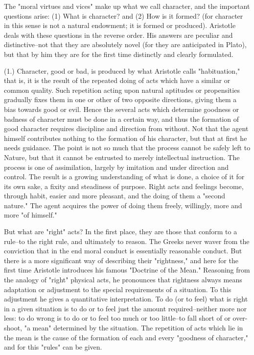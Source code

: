 The "moral virtues and vices" make up what we call character, and the
important questions arise: (1) What is character? and (2) How is it
formed? (for character in this sense is not a natural endowment; it is
formed or produced). Aristotle deals with these questions in the reverse
order. His answers are peculiar and distinctive--not that they are
absolutely novel (for they are anticipated in Plato), but that by him
they are for the first time distinctly and clearly formulated.

(1.) Character, good or bad, is produced by what Aristotle calls
"habituation," that is, it is the result of the repeated doing of acts
which have a similar or common quality. Such repetition acting upon
natural aptitudes or propensities gradually fixes them in one or other
of two opposite directions, giving them a bias towards good or evil.
Hence the several acts which determine goodness or badness of character
must be done in a certain way, and thus the formation of good character
requires discipline and direction from without. Not that the agent
himself contributes nothing to the formation of his character, but that
at first he needs guidance. The point is not so much that the process
cannot be safely left to Nature, but that it cannot be entrusted to
merely intellectual instruction. The process is one of assimilation,
largely by imitation and under direction and control. The result is a
growing understanding of what is done, a choice of it for its own sake,
a fixity and steadiness of purpose. Right acts and feelings become,
through habit, easier and more pleasant, and the doing of them a "second
nature." The agent acquires the power of doing them freely, willingly,
more and more "of himself."

But what are "right" acts? In the first place, they are those that
conform to a rule--to the right rule, and ultimately to reason. The
Greeks never waver from the conviction that in the end moral conduct is
essentially reasonable conduct. But there is a more significant way of
describing their "rightness," and here for the first time Aristotle
introduces his famous "Doctrine of the Mean." Reasoning from the analogy
of "right" physical acts, he pronounces that rightness always means
adaptation or adjustment to the special requirements of a situation. To
this adjustment he gives a quantitative interpretation. To do (or to
feel) what is right in a given situation is to do or to feel just the
amount required--neither more nor less: to do wrong is to do or to
feel too much or too little--to fall short of or over-shoot, "a mean"
determined by the situation. The repetition of acts which lie in the
mean is the cause of the formation of each and every "goodness of
character," and for this "rules" can be given.


